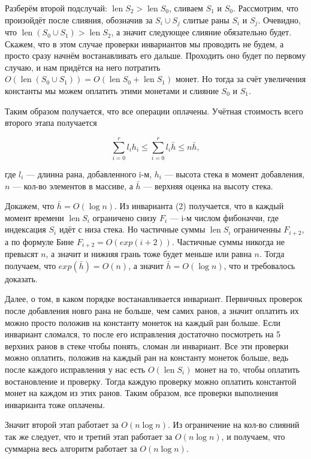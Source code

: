 \documentclass[11pt]{article}
\newcommand{\len}[0]{\operatorname{len}}
\begin{document}
Разберём второй подслучай: $\len S_2 > \len S_0$, сливаем $S_1$ и $S_0$. Рассмотрим, что произойдёт после слияния, обозначив за $S_i \cup S_j$ слитые раны $S_i$ и $S_j$. Очевидно, что $\len (S_0 \cup S_1) > \len S_2$, а значит следующее слияние обязательно будет. Скажем, что в этом случае проверки инвариантов мы проводить не будем, а просто сразу начнём востанавливать его дальше. Проходить оно будет по первому случаю, и нам придётся на него потратить $O(\len (S_0 \cup S_1)) = O(\len S_0 + \len S_1)$ монет. Но тогда за счёт увеличения константы мы можем оплатить этими монетами и слияние $S_0$ и $S_1$.

Таким образом получается, что все операции оплачены. Учётная стоимость всего второго этапа получается

\begin{equation}
	\sum_{i=0}^{r}{l_i h_i} \leq \sum_{i=0}^{r} {l_i \bar{h}} \leq n \bar{h},
\end{equation}

где $l_i$ — длинна рана, добавленного i-м, $h_i$ — высота стека в момент добавления, $n$ — кол-во элементов в массиве, а $\bar{h}$ — верхняя оценка на высоту стека. 

Докажем, что $\bar{h} = O(\log{n})$. Из инварианта (2) получается, что в каждый момент времени $\len S_i$ ограничено снизу $F_i$ — i-м числом фибоначчи, где индексация $S_i$ идёт с низа стека. Но частичные суммы $\len S_i$ ограниченны $F_{i+2}$, а по формуле Бине $F_{i+2} = O(exp(i+2))$. Частичные суммы никогда не превысят $n$, а значит и нижняя грань тоже будет меньше или равна $n$. Тогда получаем, что $exp(\bar{h}) = O(n)$, а значит $\bar{h} = O(\log{n})$, что и требовалось доказать.

Далее, о том, в каком порядке востанавливается инвариант. Первичных проверок после добавления новго рана не больше, чем самих ранов, а значит оплатить их можно просто положив на константу монеток на каждый ран больше. Если инвариант сломался, то после его исправления достаточно посмотреть на 5 верхних ранов в стеке чтобы понять, сломан ли инвариант. Все эти проверки можно оплатить, положив на каждый ран на константу монеток больше, ведь после каждого исправления у нас есть $O(\len S_i)$ монет на то, чтобы оплатить востановление и проверку. Тогда каждую проверку можно оплатить константой монет на каждом из этих ранов. Таким образом, все проверки выполнения инварианта тоже оплачены.

Значит второй этап работает за $O(n\log{n})$. Из ограничение на кол-во слияний так же следует, что и третий этап работает за $O(n\log{n})$, и получаем, что суммарна весь алгоритм работает за $O(n\log{n})$.
\end{document}
